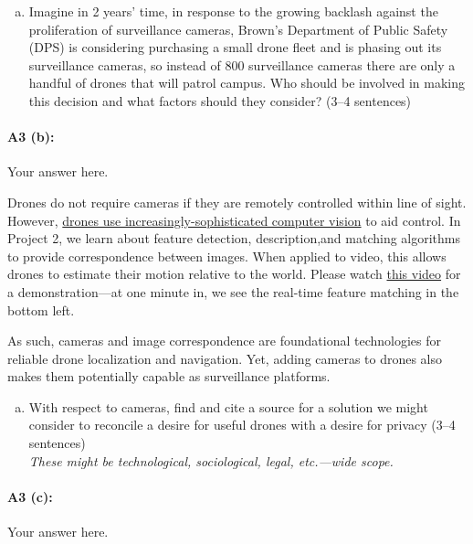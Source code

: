 \begin{enumerate}[(b)]
    \item Imagine in 2 years’ time, in response to the growing backlash against the proliferation of surveillance cameras, Brown’s Department of Public Safety (DPS) is considering purchasing a small drone fleet and is phasing out its surveillance cameras, so instead of 800 surveillance cameras there are only a handful of drones that will patrol campus. Who should be involved in making this decision and what factors should they consider? (3--4 sentences)
\end{enumerate}

\paragraph{A3 (b):} Your answer here.




\newpage
Drones do not require cameras if they are remotely controlled within line of sight. However, \href{https://link.springer.com/article/10.1007/s10846-017-0483-z}{drones use increasingly-sophisticated computer vision} to aid control. In Project 2, we learn about feature detection, description,and matching algorithms to provide correspondence between images. When applied to video, this allows drones to estimate their motion relative to the world. Please watch \href{https://www.youtube.com/watch?v=jIvJuWdmemE}{this video} for a demonstration—at one minute in, we see the real-time feature matching in the bottom left. 

As such, cameras and image correspondence are foundational technologies for reliable drone localization and navigation. Yet, adding cameras to drones also makes them potentially capable as surveillance platforms.



\begin{enumerate}[(c)]
    \item With respect to cameras, find and cite a source for a solution we might consider to reconcile a desire for useful drones with a desire for privacy (3--4 sentences) \\
    \emph{These might be technological, sociological, legal, etc.---wide scope.}
\end{enumerate}

\paragraph{A3 (c):} Your answer here.




